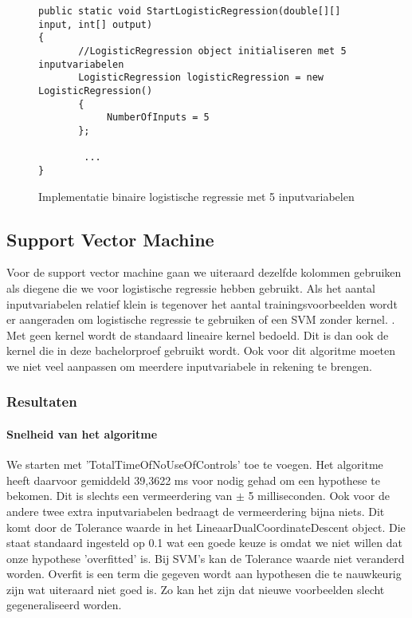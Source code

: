\begin{figure}[]
	\renewcommand{\figurename}{Code}
\begin{lstlisting}
public static void StartLogisticRegression(double[][] input, int[] output)
{
       //LogisticRegression object initialiseren met 5 inputvariabelen
       LogisticRegression logisticRegression = new LogisticRegression()
       {
       		NumberOfInputs = 5
       };
		
		...
}

\end{lstlisting}
\caption{Implementatie binaire logistische regressie met 5 inputvariabelen}
\label{code:linaireRegressieTweeKlassenM5}
\end{figure}


\newpage
\subsection{Support Vector Machine}
\label{sec:supportvectormachineFase2}
Voor de support vector machine gaan we uiteraard dezelfde kolommen gebruiken als diegene die we voor logistische regressie hebben gebruikt. Als het aantal inputvariabelen relatief klein is tegenover het aantal trainingsvoorbeelden wordt er aangeraden om logistische regressie te gebruiken of een SVM zonder kernel. \autocite{courseraSVM}. Met geen kernel wordt de standaard lineaire kernel bedoeld. Dit is dan ook de kernel die in deze bachelorproef gebruikt wordt.
Ook voor dit algoritme moeten we niet veel aanpassen om meerdere inputvariabele in rekening te brengen. 

\subsubsection{Resultaten}
\paragraph{Snelheid van het algoritme} 
We starten met 'TotalTimeOfNoUseOfControls' toe te voegen. Het algoritme heeft daarvoor gemiddeld 39,3622 ms voor nodig gehad om een hypothese te bekomen. Dit is slechts een vermeerdering van $\pm$ 5 milliseconden. Ook voor de andere twee extra inputvariabelen bedraagt de vermeerdering bijna niets. Dit komt door de Tolerance waarde in het LineaarDualCoordinateDescent object. Die staat standaard ingesteld op 0.1 wat een goede keuze is omdat we niet willen dat onze hypothese 'overfitted' is. Bij SVM's kan de Tolerance waarde niet veranderd worden. Overfit is een term die gegeven wordt aan hypothesen die te nauwkeurig zijn wat uiteraard niet goed is. Zo kan het zijn dat nieuwe voorbeelden slecht gegeneraliseerd worden. 


